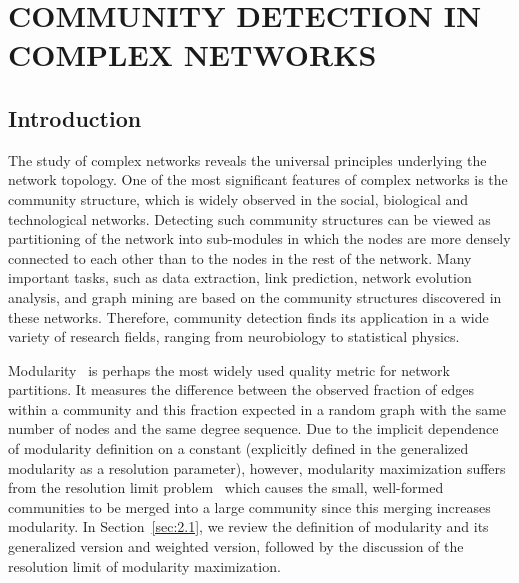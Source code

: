 \chapter{COMMUNITY DETECTION IN COMPLEX NETWORKS}
\label{chap:2}
\let\thefootnote\relax{}
\let\thefootnote\relax{}
\let\thefootnote\relax{}
\let\thefootnote\relax{}
\let\thefootnote\relax{}

\section{Introduction}

The study of complex networks reveals the universal principles underlying the network topology. One of the most significant features of complex networks is the community structure, which is widely observed in the social, biological and technological networks. Detecting such community structures can be viewed as partitioning of the network into sub-modules in which the nodes are more densely connected to each other than to the nodes in the rest of the network. Many important tasks, such as data extraction, link prediction, network evolution analysis, and graph mining are based on the community structures discovered in these networks. Therefore, community detection finds its application in a wide variety of research fields, ranging from neurobiology to statistical physics.

Modularity~\cite{newman2006modularity} is perhaps the most widely used quality metric for network partitions. It measures the difference between the observed fraction of edges within a community and this fraction expected in a random graph with the same number of nodes and the same degree sequence. Due to the implicit dependence of modularity definition on a constant (explicitly defined in the generalized modularity as a resolution parameter), however, modularity maximization suffers from the resolution limit problem~\cite{fortunato2007resolution,lancichinetti2011limits} which causes the small, well-formed communities to be merged into a large community since this merging increases modularity. In Section~\ref{sec:2.1}, we review the definition of modularity and its generalized version and weighted version, followed by the discussion of the resolution limit of modularity maximization.

